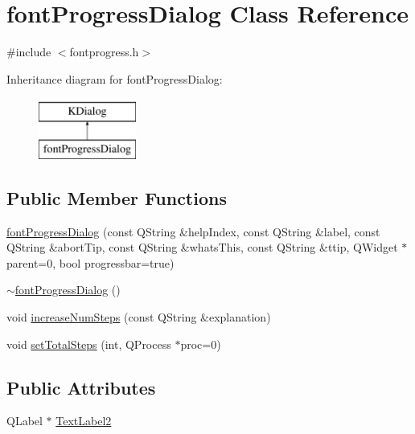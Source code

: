 \hypertarget{classfontProgressDialog}{\section{font\+Progress\+Dialog Class Reference}
\label{classfontProgressDialog}
}


{\ttfamily \#include $<$fontprogress.\+h$>$}

Inheritance diagram for font\+Progress\+Dialog\+:\begin{figure}[H]
\begin{center}
\leavevmode
\includegraphics[height=2.000000cm]{classfontProgressDialog}
\end{center}
\end{figure}
\subsection*{Public Member Functions}
\begin{DoxyCompactItemize}
\item 
\hyperlink{classfontProgressDialog_ad05fc79efe6712bfa9b957d063af65c5}{font\+Progress\+Dialog} (const Q\+String \&help\+Index, const Q\+String \&label, const Q\+String \&abort\+Tip, const Q\+String \&whats\+This, const Q\+String \&ttip, Q\+Widget $\ast$parent=0, bool progressbar=true)
\item 
\hyperlink{classfontProgressDialog_acccd94c0ee16799921bbbeb8962229ff}{$\sim$font\+Progress\+Dialog} ()
\item 
void \hyperlink{classfontProgressDialog_a7d0612d6e2d7cc4d52ec7cf7ac25570d}{increase\+Num\+Steps} (const Q\+String \&explanation)
\item 
void \hyperlink{classfontProgressDialog_ae58733e20fe7587b28cbf10f26ccd4f9}{set\+Total\+Steps} (int, Q\+Process $\ast$proc=0)
\end{DoxyCompactItemize}
\subsection*{Public Attributes}
\begin{DoxyCompactItemize}
\item 
Q\+Label $\ast$ \hyperlink{classfontProgressDialog_a6f93e7f3d73d7b90fbad9216f3958b56}{Text\+Label2}
\end{DoxyCompactItemize}


